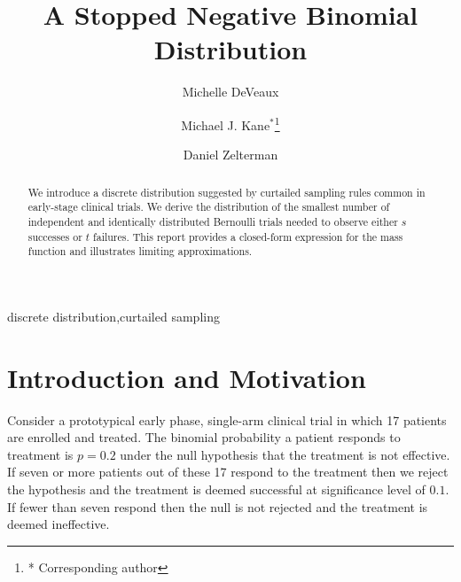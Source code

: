 \documentclass[review]{elsarticle}
\begin{document}
\begin{frontmatter}

\title{A Stopped Negative Binomial Distribution}


\author{Michelle DeVeaux}

\author{Michael J. Kane$^*$\footnote{* Corresponding author}}

\author{Daniel Zelterman}

\address{Department of Biostatistics\\ School of Epidemiology and Public Health\\ Yale University, New Haven, CT}

\begin{abstract}
We introduce a discrete distribution suggested by curtailed
sampling rules common in early-stage clinical trials. We derive the
distribution of the smallest number of independent and identically
distributed Bernoulli trials needed to observe either $s$ successes 
or $t$ failures. This report provides a closed-form expression for the 
mass function and illustrates limiting approximations.
\end{abstract}

\begin{keyword}
discrete distribution\sep curtailed sampling
\end{keyword}

\end{frontmatter}

\linenumbers

\section{Introduction and Motivation}

Consider a prototypical early phase, single-arm clinical trial in which 
17 patients
are enrolled and treated. The binomial probability a patient 
responds to treatment is $p=0.2$ 
under the null hypothesis that the treatment is not effective.
If seven or more patients out of these 17 respond to the treatment then we 
reject the hypothesis and the treatment is deemed successful at 
significance level of $0.1$.  If fewer than seven respond then the null is not 
rejected and the treatment is deemed ineffective.
\end{document}
